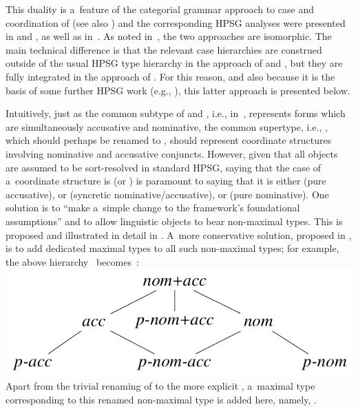 \documentclass[output=paper]{langsci/langscibook}
\begin{document}
This duality is a~feature of the categorial grammar approach to case and coordination of \citealt{Bayer96} (see also \citealt{BJ95}) and the corresponding HPSG analyses were presented in \citealt{levy:01} and \citealt{lev:pol:01}, as well as in~\citealt{dani:01}.  As noted in~\citealt[233]{lev:pol:01}, the two approaches are isomorphic.  The main technical difference is that the relevant case hierarchies are construed outside of the usual HPSG type hierarchy in the approach of \citealt{levy:01} and \citealt{lev:pol:01}, but they are fully integrated in the approach of \citealt{dani:01}.  For this reason, and also because it is the basis of some further HPSG work (e.g., \citealt{Crysmann2005c}), this latter approach is presented below.

Intuitively, just as the common subtype of  and , i.e.,  in~, represents forms which are simultaneously accusative and nominative, the common supertype, i.e., , which should perhaps be renamed to , should represent coordinate structures involving nominative and accusative conjuncts.  However, given that all objects are assumed to be sort-resolved in standard HPSG, saying that the case of a~coordinate structure is  (or ) is paramount to saying that it is either  (pure accusative), or  (syncretic nominative/accusative), or  (pure nominative).  One solution is to “make a~simple change to the framework's foundational assumptions” \citep[268]{sag:02} and to allow linguistic objects to bear non-maximal types.  This is proposed and illustrated in detail in \citealt{sag:02}.  A~more conservative solution, proposed in \citealt{dani:01}, is to add dedicated maximal types to all such non-maximal types; for example, the above hierarchy~ becomes~:
\eas
\label{daniels20} \mbox{}\\\includegraphics[scale=.35]{figures/daniels20.png}
\zs
Apart from the trivial renaming of  to the more explicit , a~maximal type corresponding to this renamed non-maximal type is added here, namely, .
\end{document}

